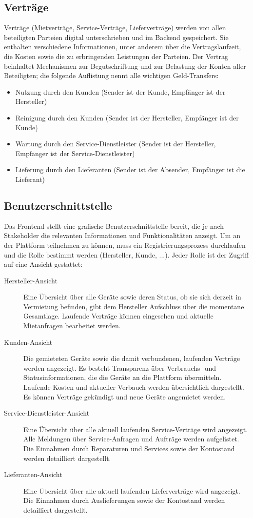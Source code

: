 \subsection{Verträge}
\label{subsec:iot_usecase:solution:contracts}
Verträge (Mietverträge, Service-Verträge, Lieferverträge) werden von allen beteiligten Parteien digital unterschrieben und im Backend gespeichert. Sie enthalten verschiedene Informationen, unter anderem über die Vertragslaufzeit, die Kosten sowie die zu erbringenden Leistungen der Parteien. Der Vertrag beinhaltet Mechanismen zur Begutschriftung und zur Belastung der Konten aller Beteiligten; die folgende Auflistung nennt alle wichtigen Geld-Transfers:
\begin{itemize}
  \item Nutzung durch den Kunden (Sender ist der Kunde, Empfänger ist der Hersteller)
  \item Reinigung durch den Kunden (Sender ist der Hersteller, Empfänger ist der Kunde)
  \item Wartung durch den Service-Dienstleister (Sender ist der Hersteller, Empfänger ist der Service-Dienstleister)
  \item Lieferung durch den Lieferanten (Sender ist der Absender, Empfänger ist die Lieferant)
\end{itemize}

\subsection{Benutzerschnittstelle}
\label{subsec:iot_usecase:solution:frontend}
Das Frontend stellt eine grafische Benutzerschnittstelle bereit, die je nach Stakeholder die relevanten Informationen und Funktionalitäten anzeigt. Um an der Plattform teilnehmen zu können, muss ein Registrierungsprozess durchlaufen und die Rolle bestimmt werden (Hersteller, Kunde, ...). Jeder Rolle ist der Zugriff auf eine Ansicht gestattet:
\begin{description}
  \item[Hersteller-Ansicht] Eine Übersicht über alle Geräte sowie deren Status, ob sie sich derzeit in Vermietung befinden, gibt dem Hersteller Aufschluss über die momentane Gesamtlage. Laufende Verträge können eingesehen und aktuelle Mietanfragen bearbeitet werden.
  \item[Kunden-Ansicht] Die gemieteten Geräte sowie die damit verbundenen, laufenden Verträge werden angezeigt. Es besteht Transparenz über Verbrauchs- und Statusinformationen, die die Geräte an die Plattform übermitteln. Laufende Kosten und aktueller Verbauch werden übersichtlich dargestellt. Es können Verträge gekündigt und neue Geräte angemietet werden.
  \item[Service-Dienstleister-Ansicht] Eine Übersicht über alle aktuell laufenden Service-Verträge wird angezeigt. Alle Meldungen über Service-Anfragen und Aufträge werden aufgelistet. Die Einnahmen durch Reparaturen und Services sowie der Kontostand werden detailliert dargestellt.
  \item[Lieferanten-Ansicht] Eine Übersicht über alle aktuell laufenden Lieferverträge wird angezeigt. Die Einnahmen durch Auslieferungen sowie der Kontostand werden detailliert dargestellt.
\end{description}

